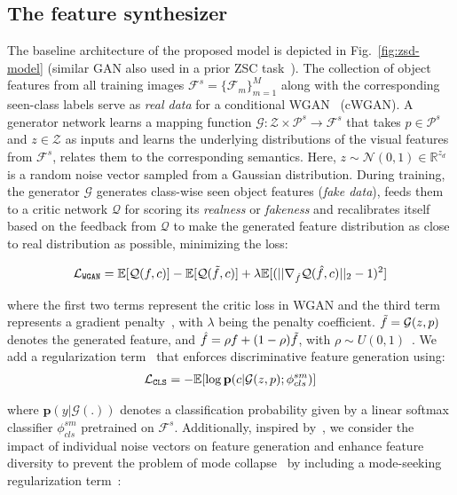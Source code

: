\documentclass{bmvc2k}
\begin{document}
\subsection{The feature synthesizer}
\label{sec:synthesizer}
The baseline architecture of the proposed model is depicted in Fig.~\ref{fig:zsd-model} (similar GAN also used in a prior ZSC task~\cite{xian2018feature}). The collection of object features from all training images $\mathcal{F}^s = \{\mathcal{F}_m \}_{m = 1}^M$ along with the corresponding seen-class labels serve as {\em real data} for a conditional WGAN~\cite{arjovsky2017wasserstein} (cWGAN). A generator network learns a mapping function $\mathcal{G}: \mathcal{Z} \times \mathcal{P}^s \longrightarrow \mathcal{F}^s$ that takes $p \in \mathcal{P}^s$ and $z \in \mathcal{Z}$ as inputs and learns the underlying distributions of the visual features from $\mathcal{F}^s$, relates them to the corresponding semantics. Here, $z \sim \mathcal{N}(0, 1) \in \mathbb{R}^{z_d}$ is a random noise vector sampled from a Gaussian distribution. During training, the generator $\mathcal{G}$ generates class-wise seen object features ({\em fake data}), feeds them to a critic network $\mathcal{Q}$ for scoring its {\em realness} or {\em fakeness} and recalibrates itself based on the feedback from $\mathcal{Q}$ to make the generated feature distribution as close to real distribution as possible, minimizing the loss:

\begin{align}
	\label{eq:wgan}
	\mathcal{L}_{\tt WGAN} = \mathbb{E}[\mathcal{Q}(f, c)] - \mathbb{E}[\mathcal{Q}(\Tilde{f}, c)] + \lambda \mathbb{E}[(|| \nabla_{\hat{f}} \mathcal{Q}(\hat{f}, c) ||_2 -1)^2]
\end{align}

where the first two terms represent the critic loss in WGAN and the third term represents a gradient penalty~\cite{gulrajani2017improved}, with $\lambda$ being the penalty coefficient. $\Tilde{f} = \mathcal{G}(z, p)$ denotes the generated feature, and $\hat{f} = \rho f + (1 - \rho)\Tilde{f}$, with $\rho \sim U(0,1)$~\cite{xian2018feature, gulrajani2017improved}. We add a regularization term~\cite{xian2018feature} that enforces discriminative feature generation using: 
\begin{align}
	\label{eq:cls}
	\mathcal{L}_{\tt CLS} = -\mathbb{E}[\log \mathbf{p}(c|\mathcal{G}(z, p); \phi_{cls}^{sm})]
\end{align}

where $\mathbf{p}(y|\mathcal{G}(.))$ denotes a classification probability given by a linear softmax classifier $\phi_{cls}^{sm}$ pretrained on $\mathcal{F}^s$. Additionally, inspired by~\cite{hayat2020synthesizing}, we consider the impact of individual noise vectors on feature generation and enhance feature diversity to prevent the problem of mode collapse~\cite{salimans2016improved} by including a mode-seeking regularization term~\cite{mao2019mode}:
\end{document}
